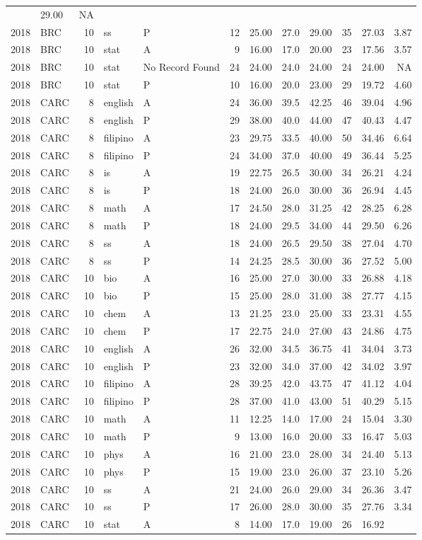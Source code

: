 \documentclass[]{article}
\begin{document}
\begin{longtable}[]{@{}rlrllrrrrrrr@{}}
& 29.00 & NA\tabularnewline
2018 & BRC & 10 & ss & P & 12 & 25.00 & 27.0 & 29.00 & 35 & 27.03 &
3.87\tabularnewline
2018 & BRC & 10 & stat & A & 9 & 16.00 & 17.0 & 20.00 & 23 & 17.56 &
3.57\tabularnewline
2018 & BRC & 10 & stat & No Record Found & 24 & 24.00 & 24.0 & 24.00 &
24 & 24.00 & NA\tabularnewline
2018 & BRC & 10 & stat & P & 10 & 16.00 & 20.0 & 23.00 & 29 & 19.72 &
4.60\tabularnewline
2018 & CARC & 8 & english & A & 24 & 36.00 & 39.5 & 42.25 & 46 & 39.04 &
4.96\tabularnewline
2018 & CARC & 8 & english & P & 29 & 38.00 & 40.0 & 44.00 & 47 & 40.43 &
4.47\tabularnewline
2018 & CARC & 8 & filipino & A & 23 & 29.75 & 33.5 & 40.00 & 50 & 34.46
& 6.64\tabularnewline
2018 & CARC & 8 & filipino & P & 24 & 34.00 & 37.0 & 40.00 & 49 & 36.44
& 5.25\tabularnewline
2018 & CARC & 8 & is & A & 19 & 22.75 & 26.5 & 30.00 & 34 & 26.21 &
4.24\tabularnewline
2018 & CARC & 8 & is & P & 18 & 24.00 & 26.0 & 30.00 & 36 & 26.94 &
4.45\tabularnewline
2018 & CARC & 8 & math & A & 17 & 24.50 & 28.0 & 31.25 & 42 & 28.25 &
6.28\tabularnewline
2018 & CARC & 8 & math & P & 18 & 24.00 & 29.5 & 34.00 & 44 & 29.50 &
6.26\tabularnewline
2018 & CARC & 8 & ss & A & 18 & 24.00 & 26.5 & 29.50 & 38 & 27.04 &
4.70\tabularnewline
2018 & CARC & 8 & ss & P & 14 & 24.25 & 28.5 & 30.00 & 36 & 27.52 &
5.00\tabularnewline
2018 & CARC & 10 & bio & A & 16 & 25.00 & 27.0 & 30.00 & 33 & 26.88 &
4.18\tabularnewline
2018 & CARC & 10 & bio & P & 15 & 25.00 & 28.0 & 31.00 & 38 & 27.77 &
4.15\tabularnewline
2018 & CARC & 10 & chem & A & 13 & 21.25 & 23.0 & 25.00 & 33 & 23.31 &
4.55\tabularnewline
2018 & CARC & 10 & chem & P & 17 & 22.75 & 24.0 & 27.00 & 43 & 24.86 &
4.75\tabularnewline
2018 & CARC & 10 & english & A & 26 & 32.00 & 34.5 & 36.75 & 41 & 34.04
& 3.73\tabularnewline
2018 & CARC & 10 & english & P & 23 & 32.00 & 34.0 & 37.00 & 42 & 34.02
& 3.97\tabularnewline
2018 & CARC & 10 & filipino & A & 28 & 39.25 & 42.0 & 43.75 & 47 & 41.12
& 4.04\tabularnewline
2018 & CARC & 10 & filipino & P & 28 & 37.00 & 41.0 & 43.00 & 51 & 40.29
& 5.15\tabularnewline
2018 & CARC & 10 & math & A & 11 & 12.25 & 14.0 & 17.00 & 24 & 15.04 &
3.30\tabularnewline
2018 & CARC & 10 & math & P & 9 & 13.00 & 16.0 & 20.00 & 33 & 16.47 &
5.03\tabularnewline
2018 & CARC & 10 & phys & A & 16 & 21.00 & 23.0 & 28.00 & 34 & 24.40 &
5.13\tabularnewline
2018 & CARC & 10 & phys & P & 15 & 19.00 & 23.0 & 26.00 & 37 & 23.10 &
5.26\tabularnewline
2018 & CARC & 10 & ss & A & 21 & 24.00 & 26.0 & 29.00 & 34 & 26.36 &
3.47\tabularnewline
2018 & CARC & 10 & ss & P & 17 & 26.00 & 28.0 & 30.00 & 35 & 27.76 &
3.34\tabularnewline
2018 & CARC & 10 & stat & A & 8 & 14.00 & 17.0 & 19.00 & 26 & 16.92 &

\end{longtable}
\end{document}
